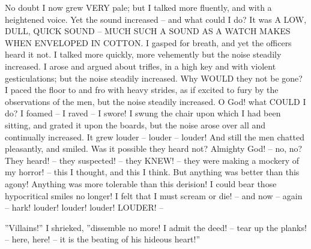 \documentclass[11pt]{article}
\begin{document}
No doubt I now grew VERY pale; but I talked
more fluently, and with a heightened voice. Yet
the sound increased -- and what could I do? It was
A LOW, DULL, QUICK SOUND -- MUCH SUCH A SOUND AS A
WATCH MAKES WHEN ENVELOPED IN COTTON. I gasped for
breath, and yet the officers heard it not. I talked
more quickly, more vehemently but the noise
steadily increased. I arose and argued about trifles,
in a high key and with violent gesticulations; but
the noise steadily increased. Why WOULD  they not
be gone? I paced the floor to and fro with heavy
strides, as if excited to fury by the observations of
the men, but the noise steadily increased. O God!
what COULD I do? I foamed -- I raved -- I swore! I
swung the chair upon which I had been sitting, and
grated it upon the boards, but the noise arose over
all and continually increased. It grew louder --
louder -- louder! And still the men chatted
pleasantly, and smiled. Was it possible they heard
not? Almighty God! -- no, no? They heard! --
they suspected! -- they KNEW! -- they were making
a mockery of my horror! -- this I thought, and this
I think. But anything was better than this agony!
Anything was more tolerable than this derision! I
could bear those hypocritical smiles no longer! I
felt that I must scream or die! -- and now -- again
-- hark! louder! louder! louder! LOUDER! --

''Villains!'' I shrieked, ''dissemble no more! I
admit the deed! -- tear up the planks! -- here, here!
-- it is the beating of his hideous heart!''


\listoffigures
\listoftables
\end{document}
